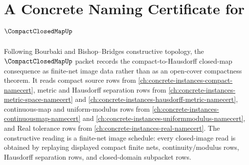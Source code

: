 \chapter{A Concrete Naming Certificate for $\CompactClosedMapUp$}
\label{ch:concrete-instances-compact-closed-map-namecert}

Following Bourbaki and Bishop--Bridges constructive topology, the $\CompactClosedMapUp$ packet records the compact-to-Hausdorff closed-map consequence as finite-net image data rather than as an open-cover compactness theorem. It reads compact source rows from \autoref{ch:concrete-instances-compact-namecert}, metric and Hausdorff separation rows from \autoref{ch:concrete-instances-metric-space-namecert} and \autoref{ch:concrete-instances-hausdorff-metric-namecert}, continuous-map and uniform-modulus rows from \autoref{ch:concrete-instances-continuousmap-namecert} and \autoref{ch:concrete-instances-uniformmodulus-namecert}, and Real tolerance rows from \autoref{ch:concrete-instances-real-namecert}. The constructive reading is a finite-net image schedule: every closed-image read is obtained by replaying displayed compact finite nets, continuity/modulus rows, Hausdorff separation rows, and closed-domain subpacket rows.

